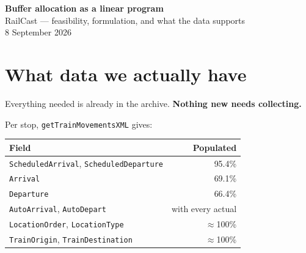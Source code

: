 \documentclass[11pt,a4paper]{article}
\newcommand{\code}[1]{\texttt{\small #1}}
\begin{document}
\begin{center}
{\LARGE\bfseries\color{accent} Buffer allocation as a linear program}\\[0.4em]
{\large RailCast --- feasibility, formulation, and what the data supports}\\[0.8em]
{\small 8 September 2026}
\end{center}

\vspace{0.4em}
\noindent{}

\section{What data we actually have}

Everything needed is already in the archive. \textbf{Nothing new needs collecting.}

Per stop, \code{getTrainMovementsXML} gives:

\begin{center}
\begin{tabular}{@{}lr@{}}
\toprule
\textbf{Field} & \textbf{Populated} \\
\midrule
\code{ScheduledArrival}, \code{ScheduledDeparture} & 95.4\% \\
\code{Arrival} & 69.1\% \\
\code{Departure} & 66.4\% \\
\code{AutoArrival}, \code{AutoDepart} & with every actual \\
\code{LocationOrder}, \code{LocationType} & $\approx$100\% \\
\code{TrainOrigin}, \code{TrainDestination} & $\approx$100\% \\
\bottomrule
\end{tabular}
\end{center}
\end{document}
